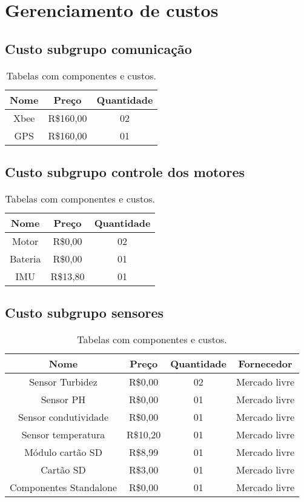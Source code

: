 \chapter[Gerenciamento de custos]{Gerenciamento de custos}

\section{Custo subgrupo comunicação}

\begin{table}[h]
	\centering
	\label{Custosubgrupocomunicação}	
	\begin{tabular}{ccc}
		\toprule
		\textbf{Nome} & \textbf{Preço} & \textbf{Quantidade} \\
		\midrule
		Xbee & R\$160,00 & 02          \\
		GPS & R\$160,00 & 01             \\
		\bottomrule
	\end{tabular}	
	\caption{Tabelas com componentes e custos.}
\end{table}
\section{Custo subgrupo controle dos motores}
\begin{table}[h]
	\centering
	\label{Custosubgrupocontroledosmotores}	
	\begin{tabular}{ccc}
		\toprule
		\textbf{Nome} & \textbf{Preço} & \textbf{Quantidade} \\
		\midrule
		Motor & R\$0,00 & 02          \\
		Bateria & R\$0,00 & 01             \\
	    IMU & R\$13,80 & 01             \\
		\bottomrule
	\end{tabular}	
	\caption{Tabelas com componentes e custos.}
\end{table}
\section{Custo subgrupo sensores}
\begin{table}[h]
	\centering
	\label{Custosubgruposensores}	
	\begin{tabular}{cccc}
		\toprule
		\textbf{Nome} & \textbf{Preço} & \textbf{Quantidade}&\textbf{Fornecedor} \\
		\midrule
		Sensor Turbidez & R\$0,00 & 02   & Mercado livre       \\
		Sensor PH & R\$0,00 & 01    & Mercado livre         \\
		Sensor condutividade & R\$0,00 & 01   & Mercado livre          \\
		Sensor temperatura & R\$10,20 & 01 & Mercado livre            \\
		Módulo cartão SD & R\$8,99 & 01   & Mercado livre          \\
		Cartão SD & R\$3,00 & 01  & Mercado livre           \\
		Componentes Standalone & R\$0,00 & 01   & Mercado livre          \\
		\bottomrule
	\end{tabular}	
	\caption{Tabelas com componentes e custos.}
\end{table}
